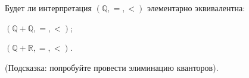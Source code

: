 Будет ли интерпретация $(\mathbb{Q}, =, <)$ элементарно эквивалентна:
\begin{enumcyr}
    \item $(\mathbb{Q} + \mathbb{Q}, =, <)$;
    \item $(\mathbb{Q} + \mathbb{R}, =, <)$.
\end{enumcyr}

(Подсказка: попробуйте провести элиминацию кванторов).